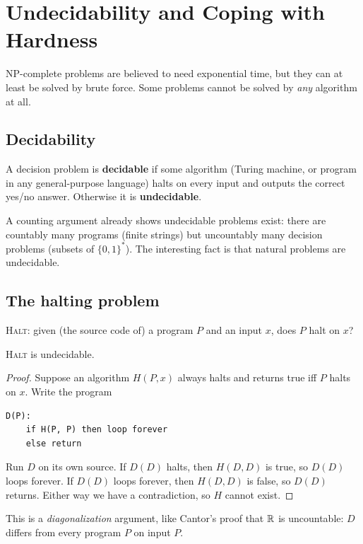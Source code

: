 \chapter{Undecidability and Coping with Hardness}

NP-complete problems are believed to need exponential time, but they can at least be solved by brute force. Some problems cannot be solved
by \emph{any} algorithm at all.

\section{Decidability}
\begin{definition}
A decision problem is \textbf{decidable} if some algorithm (Turing machine, or program in any general-purpose language) halts on every input
and outputs the correct yes/no answer. Otherwise it is \textbf{undecidable}.
\end{definition}

A counting argument already shows undecidable problems exist: there are countably many programs (finite strings) but uncountably many
decision problems (subsets of $\{0,1\}^*$). The interesting fact is that natural problems are undecidable.

\section{The halting problem}
\textsc{Halt}: given (the source code of) a program $P$ and an input $x$, does $P$ halt on $x$?

\begin{theorem}[Turing 1936]
\textsc{Halt} is undecidable.
\end{theorem}
\begin{proof}
Suppose an algorithm $H(P,x)$ always halts and returns true iff $P$ halts on $x$. Write the program
\begin{lstlisting}[style=pseudo]
D(P):
    if H(P, P) then loop forever
    else return
\end{lstlisting}
Run $D$ on its own source. If $D(D)$ halts, then $H(D,D)$ is true, so $D(D)$ loops forever. If $D(D)$ loops forever, then $H(D,D)$ is false, so
$D(D)$ returns. Either way we have a contradiction, so $H$ cannot exist.
\end{proof}
This is a \emph{diagonalization} argument, like Cantor's proof that $\mathbb{R}$ is uncountable: $D$ differs from every program $P$ on input $P$.

